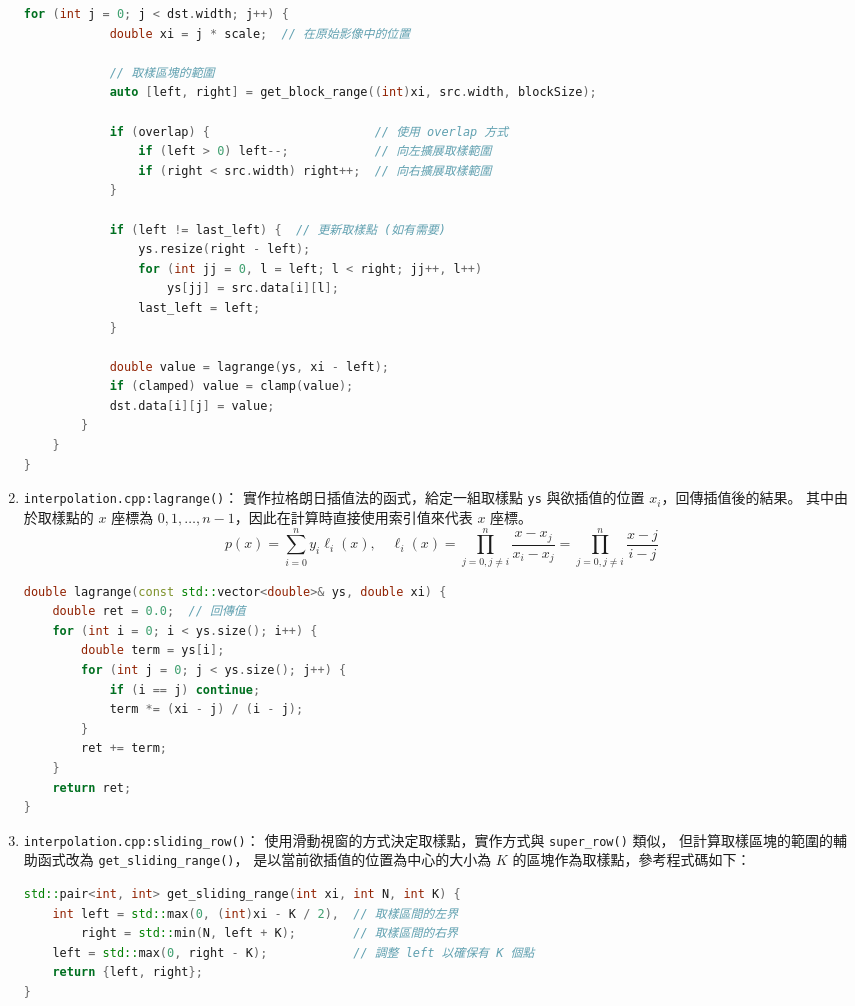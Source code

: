 \documentclass[a4paper,  10pt, oneside, fleqn]{article}
\begin{document}
\begin{enumerate}
\begin{lstlisting}[language=C++]
        for (int j = 0; j < dst.width; j++) {
            double xi = j * scale;  // 在原始影像中的位置

            // 取樣區塊的範圍
            auto [left, right] = get_block_range((int)xi, src.width, blockSize);

            if (overlap) {                       // 使用 overlap 方式
                if (left > 0) left--;            // 向左擴展取樣範圍
                if (right < src.width) right++;  // 向右擴展取樣範圍
            }

            if (left != last_left) {  // 更新取樣點 (如有需要)
                ys.resize(right - left);
                for (int jj = 0, l = left; l < right; jj++, l++)
                    ys[jj] = src.data[i][l];
                last_left = left;
            }

            double value = lagrange(ys, xi - left);
            if (clamped) value = clamp(value);
            dst.data[i][j] = value;
        }
    }
}
    \end{lstlisting}

    \item \lstinline|interpolation.cpp:lagrange()|：
          實作拉格朗日插值法的函式，給定一組取樣點 \lstinline|ys| 與欲插值的位置 $x_i$，回傳插值後的結果。
          其中由於取樣點的 $x$ 座標為 $0, 1, \ldots, n-1$，因此在計算時直接使用索引值來代表 $x$ 座標。
          \begin{equation}
              p(x) = \sum_{i=0}^{n} y_i \ell_i(x), \quad
              \ell_i(x) = \prod_{j=0, j \neq i}^{n} \frac{x - x_j}{x_i - x_j}
              = \prod_{j=0, j \neq i}^{n} \frac{x - j}{i - j}
          \end{equation}
          \begin{lstlisting}[language=C++]
double lagrange(const std::vector<double>& ys, double xi) {
    double ret = 0.0;  // 回傳值
    for (int i = 0; i < ys.size(); i++) {
        double term = ys[i];
        for (int j = 0; j < ys.size(); j++) {
            if (i == j) continue;
            term *= (xi - j) / (i - j);
        }
        ret += term;
    }
    return ret;
}
    \end{lstlisting}

    \item \lstinline|interpolation.cpp:sliding_row()|：
          使用滑動視窗的方式決定取樣點，實作方式與 \lstinline|super_row()| 類似，
          但計算取樣區塊的範圍的輔助函式改為 \lstinline|get_sliding_range()|，
          是以當前欲插值的位置為中心的大小為 $K$ 的區塊作為取樣點，參考程式碼如下：
          \begin{lstlisting}[language=C++]
std::pair<int, int> get_sliding_range(int xi, int N, int K) {
    int left = std::max(0, (int)xi - K / 2),  // 取樣區間的左界
        right = std::min(N, left + K);        // 取樣區間的右界
    left = std::max(0, right - K);            // 調整 left 以確保有 K 個點
    return {left, right};
}
\end{lstlisting}
\end{enumerate}
\end{document}
